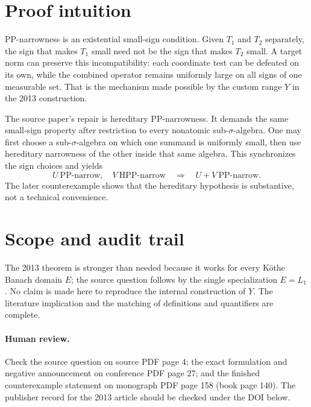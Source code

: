 \documentclass[11pt]{article}
\begin{document}
\clearpage
\section*{Proof intuition}
PP-narrowness is an existential small-sign condition.  Given $T_1$ and $T_2$
separately, the sign that makes $T_1$ small need not be the sign that makes
$T_2$ small.  A target norm can preserve this incompatibility: each coordinate
test can be defeated on its own, while the combined operator remains uniformly
large on all signs of one measurable set.  That is the mechanism made possible
by the custom range $Y$ in the 2013 construction.

The source paper's repair is hereditary PP-narrowness.  It demands the same
small-sign property after restriction to every nonatomic sub-$\sigma$-algebra.
One may first choose a sub-$\sigma$-algebra on which one summand is uniformly
small, then use hereditary narrowness of the other inside that same algebra.
This synchronizes the sign choices and yields
\[
 U\ \text{PP-narrow},\quad V\ \text{HPP-narrow}
 \quad\Longrightarrow\quad U+V\ \text{PP-narrow}.
\]
The later counterexample shows that the hereditary hypothesis is substantive,
not a technical convenience.

\section*{Scope and audit trail}
The 2013 theorem is stronger than needed because it works for every K\"othe
Banach domain $E$; the source question follows by the single specialization
$E=L_1$.  No claim is made here to reproduce the internal construction of $Y$.
The literature implication and the matching of definitions and quantifiers are
complete.

\paragraph{Human review.}
Check the source question on source PDF page 4; the exact formulation and
negative announcement on conference PDF page 27; and the finished
counterexample statement on monograph PDF page 158 (book page 140).  The
publisher record for the 2013 article should be checked under the DOI below.
\end{document}
